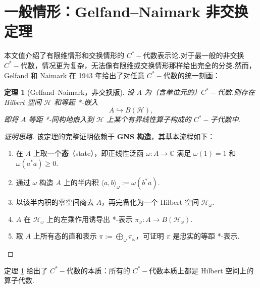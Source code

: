 \documentclass[math-font=lm, text-font=lm, math-style=TeX]{sjtureport}
\newtheorem{theorem}{定理}[chapter]
\theoremstyle{plain}
\newtheorem*{proof}{证明}
\theoremstyle{plain}
\begin{document}
\section{一般情形：Gelfand--Naimark 非交换定理}

本文值介绍了有限维情形和交换情形的 $C^*-\!$代数表示论.对于最一般的非交换 $C^*-\!$代数，情况更为复杂，无法像有限维或交换情形那样给出完全的分类.然而，Gelfand 和 Naimark 在 1943 年给出了对任意 $C^*-\!$代数的统一刻画：

\begin{theorem}[Gelfand--Naimark，非交换版]\label{thm:gn-noncommutative}
    设 $A$ 为（含单位元的）$C^*-\!$代数.则存在 Hilbert 空间 $\mathcal{H}$ 和等距 *-嵌入
    \begin{equation}\label{eq:gn-embedding}
        A \hookrightarrow B(\mathcal{H}),
    \end{equation}
    即将 $A$ 等距 *-同构地嵌入到 $\mathcal{H}$ 上某个有界线性算子构成的 $C^*-\!$子代数中.
\end{theorem}

\begin{proof}[证明思路]
    该定理的完整证明依赖于 \textbf{GNS 构造}，其基本流程如下：
    \begin{enumerate}
        \item 在 $A$ 上取一个\textbf{态}（state），即正线性泛函 $\omega: A \to \mathbb{C}$ 满足 $\omega(1) = 1$ 和 $\omega(a^*a) \geq 0$.
        \item 通过 $\omega$ 构造 $A$ 上的半内积 $\langle a, b \rangle_\omega := \omega(b^*a)$.
        \item 以该半内积的零空间商去 $A$，再完备化为一个 Hilbert 空间 $\mathcal{H}_\omega$.
        \item $A$ 在 $\mathcal{H}_\omega$ 上的左乘作用诱导出 *-表示 $\pi_\omega: A \to B(\mathcal{H}_\omega)$.
        \item 取 $A$ 上所有态的直和表示 $\pi := \bigoplus_{\omega} \pi_\omega$，可证明 $\pi$ 是忠实的等距 *-表示.
    \end{enumerate}
\end{proof}

定理 \ref{thm:gn-noncommutative} 给出了 $C^*-\!$代数的本质：所有的 $C^*-\!$代数本质上都是 Hilbert 空间上的算子代数.
\end{document}
